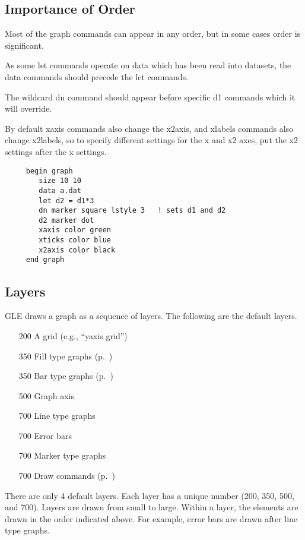 \subsection{Importance of Order}
Most of the graph commands can appear in any order, but in some
cases order is significant.

As some {\sf let} commands operate on data which has been read into datasets,
the {\sf data} commands should precede the {\sf let} commands.

The wildcard {\sf dn} command should appear before
specific {\sf d1} commands which it will override.

By default xaxis commands also change the x2axis, and xlabels commands
also change x2labels, so to specify different settings for
the x and x2 axes, put the x2 settings after the x settings.

\preglecode{}
\begin{Verbatim}
     begin graph
        size 10 10
        data a.dat
        let d2 = d1*3
        dn marker square lstyle 3   ! sets d1 and d2
        d2 marker dot
        xaxis color green
        xticks color blue
        x2axis color black
     end graph
\end{Verbatim}
\postglecode{}

\subsection{Layers}

GLE draws a graph as a sequence of layers. The following are the default layers.

\begin{itemize}
\item[200] A grid (e.g., ``yaxis grid'')
\item[350] Fill type graphs (p.~\pageref{cmd:fill})
\item[350] Bar type graphs (p.~\pageref{cmd:bar})
\item[500] Graph axis
\item[700] Line type graphs
\item[700] Error bars
\item[700] Marker type graphs
\item[700] Draw commands (p.~\pageref{cmd:draw})
\end{itemize}

There are only 4 default layers. Each layer has a unique number (200, 350, 500, and 700). Layers are drawn from small to large. Within a layer, the elements are drawn in the order indicated above. For example, error bars are drawn after line type graphs.

